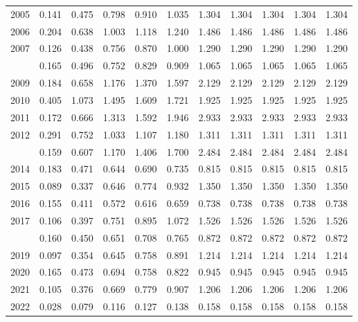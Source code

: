 \documentclass[
]{article}
\begin{document}
\begin{longtable}[t]{lrrrrrrrrrr}
2005 & 0.141 & 0.475 & 0.798 & 0.910 & 1.035 & 1.304 & 1.304 & 1.304 & 1.304 & 1.304\\
2006 & 0.204 & 0.638 & 1.003 & 1.118 & 1.240 & 1.486 & 1.486 & 1.486 & 1.486 & 1.486\\
2007 & 0.126 & 0.438 & 0.756 & 0.870 & 1.000 & 1.290 & 1.290 & 1.290 & 1.290 & 1.290\\
\addlinespace
2008 & 0.165 & 0.496 & 0.752 & 0.829 & 0.909 & 1.065 & 1.065 & 1.065 & 1.065 & 1.065\\
2009 & 0.184 & 0.658 & 1.176 & 1.370 & 1.597 & 2.129 & 2.129 & 2.129 & 2.129 & 2.129\\
2010 & 0.405 & 1.073 & 1.495 & 1.609 & 1.721 & 1.925 & 1.925 & 1.925 & 1.925 & 1.925\\
2011 & 0.172 & 0.666 & 1.313 & 1.592 & 1.946 & 2.933 & 2.933 & 2.933 & 2.933 & 2.933\\
2012 & 0.291 & 0.752 & 1.033 & 1.107 & 1.180 & 1.311 & 1.311 & 1.311 & 1.311 & 1.311\\
\addlinespace
2013 & 0.159 & 0.607 & 1.170 & 1.406 & 1.700 & 2.484 & 2.484 & 2.484 & 2.484 & 2.484\\
2014 & 0.183 & 0.471 & 0.644 & 0.690 & 0.735 & 0.815 & 0.815 & 0.815 & 0.815 & 0.815\\
2015 & 0.089 & 0.337 & 0.646 & 0.774 & 0.932 & 1.350 & 1.350 & 1.350 & 1.350 & 1.350\\
2016 & 0.155 & 0.411 & 0.572 & 0.616 & 0.659 & 0.738 & 0.738 & 0.738 & 0.738 & 0.738\\
2017 & 0.106 & 0.397 & 0.751 & 0.895 & 1.072 & 1.526 & 1.526 & 1.526 & 1.526 & 1.526\\
\addlinespace
2018 & 0.160 & 0.450 & 0.651 & 0.708 & 0.765 & 0.872 & 0.872 & 0.872 & 0.872 & 0.872\\
2019 & 0.097 & 0.354 & 0.645 & 0.758 & 0.891 & 1.214 & 1.214 & 1.214 & 1.214 & 1.214\\
2020 & 0.165 & 0.473 & 0.694 & 0.758 & 0.822 & 0.945 & 0.945 & 0.945 & 0.945 & 0.945\\
2021 & 0.105 & 0.376 & 0.669 & 0.779 & 0.907 & 1.206 & 1.206 & 1.206 & 1.206 & 1.206\\
2022 & 0.028 & 0.079 & 0.116 & 0.127 & 0.138 & 0.158 & 0.158 & 0.158 & 0.158 & 0.158\\*
\end{longtable}
\end{document}
